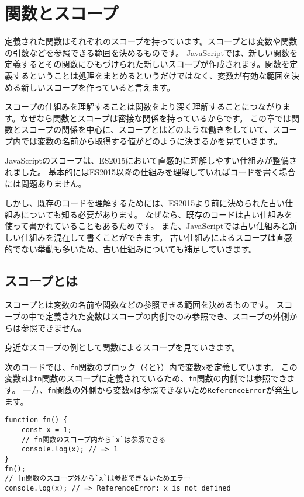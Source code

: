\hypertarget{function-and-scope}{%
\chapter{関数とスコープ}\label{function-and-scope}}

定義された関数はそれぞれのスコープを持っています。スコープとは変数や関数の引数などを参照できる範囲を決めるものです。
JavaScriptでは、新しい関数を定義するとその関数にひもづけられた新しいスコープが作成されます。関数を定義するということは処理をまとめるというだけではなく、変数が有効な範囲を決める新しいスコープを作っていると言えます。

スコープの仕組みを理解することは関数をより深く理解することにつながります。なぜなら関数とスコープは密接な関係を持っているからです。
この章では関数とスコープの関係を中心に、スコープとはどのような働きをしていて、スコープ内では変数の名前から取得する値がどのように決まるかを見ていきます。

JavaScriptのスコープは、ES2015において直感的に理解しやすい仕組みが整備されました。
基本的にはES2015以降の仕組みを理解していればコードを書く場合には問題ありません。

しかし、既存のコードを理解するためには、ES2015より前に決められた古い仕組みについても知る必要があります。
なぜなら、既存のコードは古い仕組みを使って書かれていることもあるためです。
また、JavaScriptでは古い仕組みと新しい仕組みを混在して書くことができます。
古い仕組みによるスコープは直感的でない挙動も多いため、古い仕組みについても補足していきます。

\hypertarget{what-is-scope}{%
\section{スコープとは}\label{what-is-scope}}

スコープとは変数の名前や関数などの参照できる範囲を決めるものです。
スコープの中で定義された変数はスコープの内側でのみ参照でき、スコープの外側からは参照できません。

身近なスコープの例として関数によるスコープを見ていきます。

次のコードでは、\texttt{fn}関数のブロック（\texttt{\{}と\texttt{\}}）内で変数\texttt{x}を定義しています。
この変数\texttt{x}は\texttt{fn}関数のスコープに定義されているため、\texttt{fn}関数の内側では参照できます。
一方、\texttt{fn}関数の外側から変数\texttt{x}は参照できないため\texttt{ReferenceError}が発生します。

\begin{lstlisting}
function fn() {
    const x = 1;
    // fn関数のスコープ内から`x`は参照できる
    console.log(x); // => 1
}
fn();
// fn関数のスコープ外から`x`は参照できないためエラー
console.log(x); // => ReferenceError: x is not defined
\end{lstlisting}


